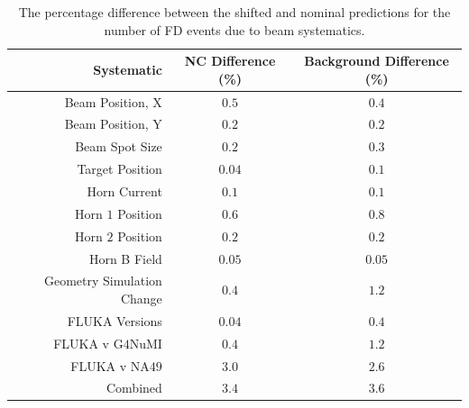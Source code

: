 \begin{table}[htb]
  \begin{center}
    \begin{tabular}{r c c}
      \hline\hline
      Systematic & NC Difference (\%) & Background Difference (\%) \\
      \hline
      Beam Position, X & $0.5$ & $0.4$ \\
      Beam Position, Y & $0.2$ & $0.2$ \\
      Beam Spot Size & $0.2$ & $0.3$ \\
      Target Position & $0.04$ & $0.1$ \\
      Horn Current & $0.1$ & $0.1$ \\
      Horn $1$ Position & $0.6$ & $0.8$ \\
      Horn $2$ Position & $0.2$ & $0.2$ \\
      Horn B Field & $0.05$ & $0.05$ \\
      Geometry Simulation Change & $0.4$ & $1.2$ \\
      FLUKA Versions & $0.04$ & $0.4$ \\
      FLUKA v G$4$NuMI & $0.4$ & $1.2$ \\
      FLUKA v NA$49$ & $3.0$ & $2.6$ \\
      \hline
      Combined & $3.4$ & $3.6$ \\
      \hline
    \end{tabular}
    \caption[Beam Systematic Errors]{The percentage difference between the shifted and nominal predictions for the number of FD events due to beam systematics.}
    \label{tab:SystBeam}
  \end{center}
\end{table}

